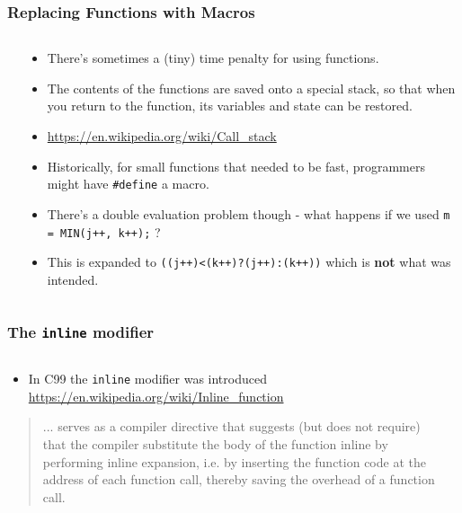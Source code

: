 \begin{frame}[fragile]
\frametitle{Replacing Functions with Macros}
\begin{columns}

\begin{column}{0.40\textwidth}

\end{column}

\pause
\begin{column}{0.50\textwidth}
\begin{itemize}[<+->]
\item There's sometimes a (tiny) time penalty for using functions.
\item The contents of the functions are saved onto a special stack, so that when you return to the function, its variables and state can be restored.
\item \url{https://en.wikipedia.org/wiki/Call_stack}
\item Historically, for small functions that needed to be fast, programmers might have \verb^#define^ a macro.
\item There's a double evaluation problem though - what happens if we used {\tt m = MIN(j++, k++);} ?
\item This is expanded to {\tt ((j++)<(k++)?(j++):(k++))} which is {\bf not} what was intended.
\end{itemize}
\end{column}

\end{columns}
\end{frame}


\begin{frame}[fragile]
\frametitle{The {\tt inline} modifier}
\begin{columns}

\begin{column}{0.50\textwidth}
\begin{itemize}[<+->]
\item In C99 the {\tt inline} modifier was introduced
\url{https://en.wikipedia.org/wiki/Inline_function}
\end{itemize}
\begin{quote}
... serves as a compiler directive that suggests (but does not
require) that the compiler substitute the body of the function inline by
performing inline expansion, i.e. by inserting the function code at the
address of each function call, thereby saving the overhead of a function
call.
\end{quote}
\end{column}

\begin{column}{0.40\textwidth}

\end{column}

\end{columns}
\end{frame}

